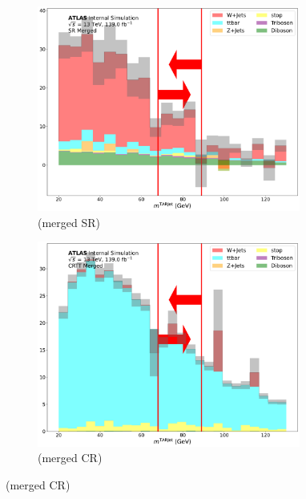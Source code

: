 \begin{figure}[htbp]
      \begin{subfigure}{0.45\textwidth}
     \includegraphics[width = 0.95\textwidth]{Figures/App_SR_CR_distributions/SR1L_Merged/TARJets10_mTAR0_N_1.pdf}
    \caption{\mTAR (merged SR)}
     \end{subfigure}
    \begin{subfigure}{0.45\textwidth}
     \includegraphics[width = 0.95\textwidth]{Figures/App_SR_CR_distributions/CRTT_Merged/TARJets10_mTAR0_N_1.pdf}
     \caption{\mTAR (merged \ttbar CR)}
     \end{subfigure}


\end{figure}
